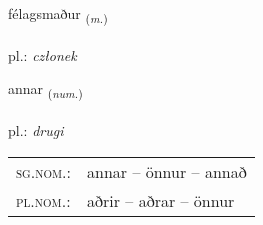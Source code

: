 \documentclass[frontgrid, backgrid]{flacards}\usepackage[]{graphicx}\usepackage[]{xcolor}
\begin{document}
\renewcommand{\flhead}{\vskip5pt \fboxsep=0pt {\small\bfseries\footnotesize Nafnorð | Noun}}
\renewcommand{\fcfoot}{\vskip5pt \fboxsep=0pt \hspace{2pt}{\small\bfseries\footnotesize 2K}}

\renewcommand{\blhead}{\vskip5pt {\small\bfseries\footnotesize Nafnorð | Noun }}
\renewcommand{\bcfoot}{\vskip5pt \hspace{2pt}{\small\bfseries\footnotesize 2K}}


{félagsmaður \small{\textsubscript{(\textit{m.})}} \\[1ex] %
\textphonetic{[fjɛːlaxsmaðʏr]} \\
pl.: \emph{członek} \\  [2ex]
\renewcommand*{\arraystretch}{0.8}
}

\renewcommand{\flhead}{\vskip5pt \fboxsep=0pt {\small\bfseries\footnotesize Töluorð | Numeral}}
\renewcommand{\fcfoot}{\vskip5pt \fboxsep=0pt \hspace{2pt}{\small\bfseries\footnotesize 2K}}

\renewcommand{\blhead}{\vskip5pt {\small\bfseries\footnotesize Töluorð | Numeral }}
\renewcommand{\bcfoot}{\vskip5pt \hspace{2pt}{\small\bfseries\footnotesize 2K}}


{annar \small{\textsubscript{(\textit{num.})}} \\[1ex] %
\textphonetic{[anar]} \\
pl.: \emph{drugi} \\  [2ex]
\renewcommand*{\arraystretch}{0.8}
\begin{tabular}{ll}
\textsc{sg.nom.}: & annar  --  önnur -- annað \\ 
\textsc{pl.nom.}: & aðrir -- aðrar -- önnur
\end{tabular}
}
\end{document}
